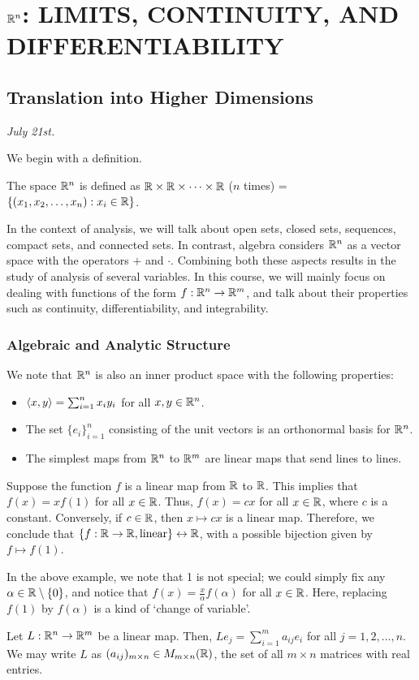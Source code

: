 \chapter{$\mathbb{R}^{n}$: LIMITS, CONTINUITY, AND DIFFERENTIABILITY}

\section{Translation into Higher Dimensions}
\textit{July 21st.}

We begin with a definition.
\begin{definition}
    The space $\mathbb{R}^{n}$ is defined as $\mathbb{R} \times \mathbb{R} \times \cdots \times \mathbb{R}$ ($n$ times) = $\{(x_{1},x_{2},\ldots,x_{n}) : x_{i} \in \mathbb{R}\}$.
\end{definition}
In the context of analysis, we will talk about open sets, closed sets, sequences, compact sets, and connected sets. In contrast, algebra considers $\mathbb{R}^{n}$ as a vector space with the operators $+$ and $\cdot$. Combining both these aspects results in the study of analysis of several variables. In this course, we will mainly focus on dealing with functions of the form $f: \mathbb{R}^{n} \to \mathbb{R}^{m}$, and talk about their properties such as continuity, differentiability, and integrability.

\subsection{Algebraic and Analytic Structure}
We note that $\mathbb{R}^{n}$ is also an inner product space with the following properties:
\begin{itemize}
    \item $\langle x,y\rangle = \sum_{i=1}^{n} x_{i}y_{i}$ for all $x,y \in \mathbb{R}^{n}$.
    \item The set $\{e_{i}\}_{i=1}^{n}$ consisting of the unit vectors is an orthonormal basis for $\mathbb{R}^{n}$.
    \item The simplest maps from $\mathbb{R}^{n}$ to $\mathbb{R}^{m}$ are linear maps that send lines to lines.
\end{itemize}

\begin{example}
    Suppose the function $f$ is a linear map from $\mathbb{R}$ to $\mathbb{R}$. This implies that $f(x) = xf(1)$ for all $x \in \mathbb{R}$. Thus, $f(x) = cx$ for all $x \in \mathbb{R}$, where $c$ is a constant. Conversely, if $c \in \mathbb{R}$, then $x \mapsto cx$ is a linear map. Therefore, we conclude that $\{f: \mathbb{R} \to \mathbb{R}, \text{linear}\} \leftrightarrow \mathbb{R}$, with a possible bijection given by $f \mapsto f(1)$.
\end{example}
In the above example, we note that 1 is not special; we could simply fix any $\alpha \in \mathbb{R}\setminus\{0\}$, and notice that $f(x) = \frac{x}{\alpha} f(\alpha)$ for all $x \in \mathbb{R}$. Here, replacing $f(1)$ by $f(\alpha)$ is a kind of `change of variable'.
\begin{remark}
    Let $L:\mathbb{R}^{n} \to \mathbb{R}^{m}$ be a linear map. Then, $Le_{j} = \sum_{i=1}^{m} a_{ij} e_{i}$ for all $j = 1,2,\ldots,n$. We may write $L$ as $(a_{ij})_{m \times n} \in M_{m \times n}(\mathbb{R})$, the set of all $m \times n$ matrices with real entries.
\end{remark}

